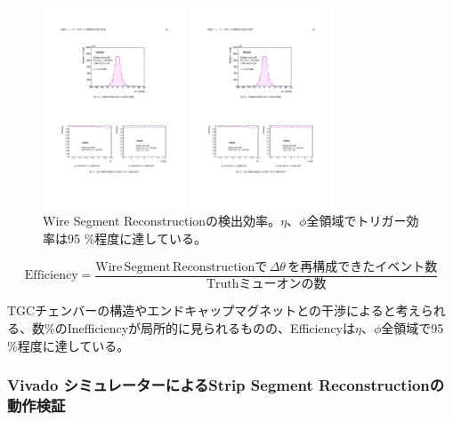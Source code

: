 \begin{figure}
    \begin{minipage}[b]{.5\linewidth}
    \centering
    \includegraphics[height=6cm]{fig/Test/Vivado_Wire_eta.pdf}
    \end{minipage}%
    \begin{minipage}[b]{.5\linewidth}
    \centering
    \includegraphics[height=6cm]{fig/Test/Vivado_Wire_phi.pdf}
    \end{minipage}%
    \caption[Wire Segment Reconstructionの検出効率]{Wire Segment Reconstructionの検出効率\cite{mt_nabeyama}。$\eta$、$\phi$全領域でトリガー効率は95 \%程度に達している。}
    \label{Vivado_Wire_Efficiency}
    \end{figure}
    
    \begin{equation}
    \mathrm{Efficiency} = \frac{\mathrm{Wire \,Segment \,Reconstructionで}\,\Delta\theta\,\mathrm{を再構成できたイベント数}}{\mathrm{Truth ミューオン の数}}
\end{equation}

TGCチェンバーの構造やエンドキャップマグネットとの干渉によると考えられる、数\%のInefficiencyが局所的に見られるものの、Efficiencyは$\eta$、$\phi$全領域で95 \%程度に達している。

\subsubsection*{Vivado シミュレーターによるStrip Segment Reconstructionの動作検証}

